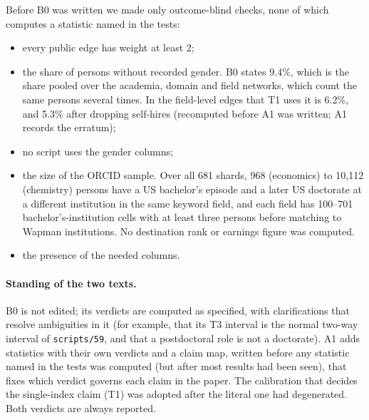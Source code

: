 \documentclass[11pt]{article}
\newcommand{\scr}[1]{\texttt{scripts/#1}}
\begin{document}
Before B0 was written we made only outcome-blind checks, none of which computes a statistic named in the tests:
\begin{itemize}
\item every public edge has weight at least 2;
\item the share of persons without recorded gender. B0 states 9.4\%, which is the share pooled over the academia,
domain and field networks, which count the same persons several times. In the field-level edges that T1 uses it
is 6.2\%, and 5.3\% after dropping self-hires (recomputed before A1 was written; A1 records the erratum);
\item no script uses the gender columns;
\item the size of the ORCID sample. Over all 681 shards, 968 (economics) to 10{,}112 (chemistry) persons have a US
bachelor's episode and a later US doctorate at a different institution in the same keyword field, and each field
has 100--701 bachelor's-institution cells with at least three persons before matching to Wapman institutions. No
destination rank or earnings figure was computed.
\item the presence of the needed columns.
\end{itemize}

\paragraph{Standing of the two texts.} B0 is not edited; its verdicts are computed as specified, with
clarifications that resolve ambiguities in it (for example, that its T3 interval is the normal two-way interval of
\scr{59}, and that a postdoctoral role is not a doctorate). A1 adds statistics with their own verdicts and a claim
map, written before any statistic named in the tests was computed (but after most results had been seen), that
fixes which verdict governs each claim in the paper. The calibration that decides the single-index claim (T1) was
adopted after the literal one had degenerated. Both verdicts are always reported.
\end{document}
